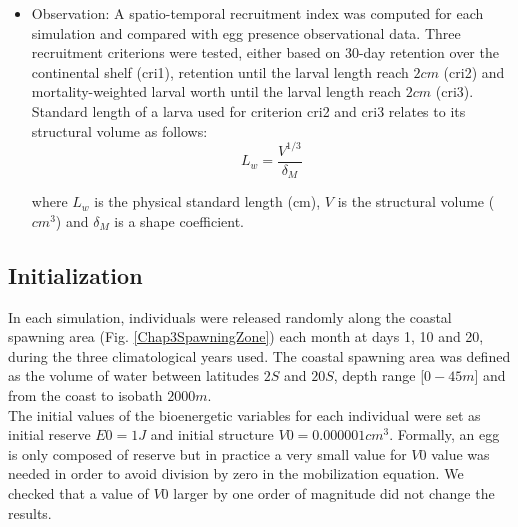 \begin{itemize}

\item Observation: A spatio-temporal recruitment index was computed for each simulation and compared with egg presence observational data. Three recruitment criterions were tested, either based on 30-day retention over the continental shelf (\gls{cri1}), retention until the larval length reach $2 cm$ (\gls{cri2}) and mortality-weighted larval worth until the larval length reach $2 cm$ (\gls{cri3}). Standard length of a larva used for criterion \gls{cri2} and \gls{cri3} relates to its structural volume as follows:\\

\begin{equation}
	L_{w} = \frac
				{V^{1/3}}
				{\delta_{M}}
	\label{L_W}
\end{equation}

where $L_{w}$ is the physical standard length (cm), $V$ is the structural volume ($cm^3$) 
and $\delta_{M}$ is a shape coefficient.\\

\end{itemize}

\subsection{Initialization}
In each simulation, individuals were released randomly along the coastal spawning area (Fig. \ref{Chap3SpawningZone}) each month at days 1, 10 and 20, during the three climatological years used. The coastal spawning area was defined as the volume of water between latitudes $2$\textdegree $S$ and $20$\textdegree $S$, depth range [$0 - 45 m$] and from the coast to isobath $2000 m$.\\

The initial values of the bioenergetic variables for each individual were set as initial reserve $E0=1J$ and initial structure $V0=0.000001cm^3$. Formally, an egg is only composed of reserve but in practice a very small value for $V0$ value was needed in order to avoid division by zero in the mobilization equation. We checked that a value of $V0$ larger by one order of magnitude did not change the results.\\


